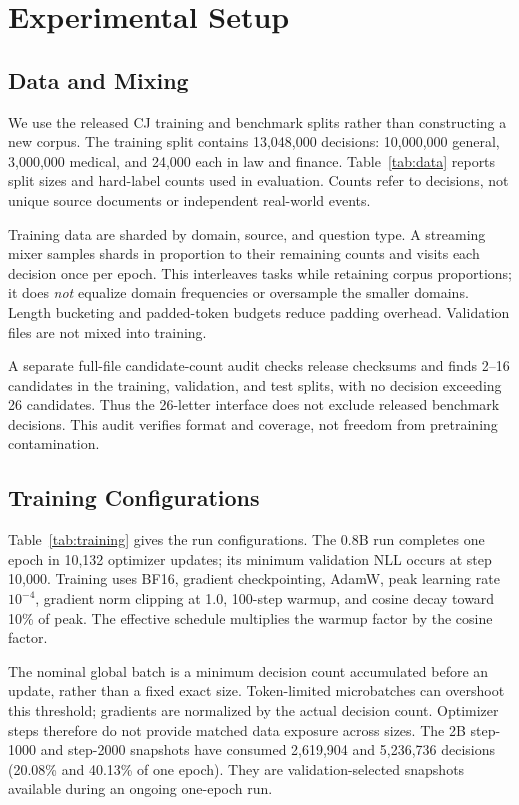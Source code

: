 \section{Experimental Setup}
\label{sec:setup}
\subsection{Data and Mixing}
We use the released CJ training and benchmark splits rather than constructing a new corpus. The training split contains 13,048,000 decisions: 10,000,000 general, 3,000,000 medical, and 24,000 each in law and finance. Table~\ref{tab:data} reports split sizes and hard-label counts used in evaluation. Counts refer to decisions, not unique source documents or independent real-world events.



Training data are sharded by domain, source, and question type. A streaming mixer samples shards in proportion to their remaining counts and visits each decision once per epoch. This interleaves tasks while retaining corpus proportions; it does \emph{not} equalize domain frequencies or oversample the smaller domains. Length bucketing and padded-token budgets reduce padding overhead. Validation files are not mixed into training.

A separate full-file candidate-count audit checks release checksums and finds 2--16 candidates in the training, validation, and test splits, with no decision exceeding 26 candidates. Thus the 26-letter interface does not exclude released benchmark decisions. This audit verifies format and coverage, not freedom from pretraining contamination.

\subsection{Training Configurations}

Table~\ref{tab:training} gives the run configurations. The 0.8B run completes one epoch in 10,132 optimizer updates; its minimum validation NLL occurs at step 10,000. Training uses BF16, gradient checkpointing, AdamW, peak learning rate $10^{-4}$, gradient norm clipping at 1.0, 100-step warmup, and cosine decay toward 10\% of peak. The effective schedule multiplies the warmup factor by the cosine factor.

The nominal global batch is a minimum decision count accumulated before an update, rather than a fixed exact size. Token-limited microbatches can overshoot this threshold; gradients are normalized by the actual decision count. Optimizer steps therefore do not provide matched data exposure across sizes. The 2B step-1000 and step-2000 snapshots have consumed 2,619,904 and 5,236,736 decisions (20.08\% and 40.13\% of one epoch). They are validation-selected snapshots available during an ongoing one-epoch run.

